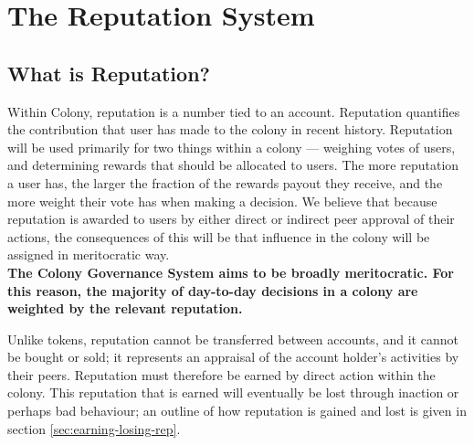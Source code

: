 \section{The Reputation System}\label{sec:reputation}
\subsection{What is Reputation?}\label{subsec:what-is-reputation}

Within Colony, reputation is a number tied to an account. Reputation quantifies the contribution that user has made to the colony in recent history. Reputation will be used primarily for two things within a colony --- weighing votes of users, and determining rewards that should be allocated to users. The more reputation a user has, the larger the fraction of the rewards payout they receive, and the more weight their vote has when making a decision. We believe that because reputation is awarded to users by either direct or indirect peer approval of their actions, the consequences of this will be that influence in the colony will be assigned in meritocratic way.\\

\textbf{The Colony Governance System aims to be broadly meritocratic. For this reason, the majority of day-to-day decisions in a colony are weighted by the relevant reputation.} %

Unlike tokens, reputation cannot be transferred between accounts, and it cannot be bought or sold; it represents an appraisal of the account holder's activities by their peers. Reputation must therefore be earned by direct action within the colony. This reputation that is earned will eventually be lost through inaction or perhaps bad behaviour; an outline of how reputation is gained and lost is given in section \ref{sec:earning-losing-rep}. 




